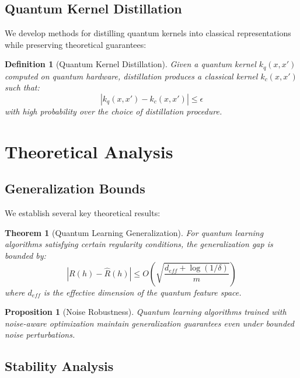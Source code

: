 \documentclass{article}
\newtheorem{theorem}{Theorem}
\newtheorem{proposition}{Proposition}
\newtheorem{definition}{Definition}
\begin{document}
\subsection{Quantum Kernel Distillation}

We develop methods for distilling quantum kernels into classical representations while preserving theoretical guarantees:

\begin{definition}[Quantum Kernel Distillation]
Given a quantum kernel $k_q(x, x')$ computed on quantum hardware, distillation produces a classical kernel $k_c(x, x')$ such that:
\begin{equation}
|k_q(x, x') - k_c(x, x')| \leq \epsilon
\end{equation}
with high probability over the choice of distillation procedure.
\end{definition}

\section{Theoretical Analysis}

\subsection{Generalization Bounds}

We establish several key theoretical results:

\begin{theorem}[Quantum Learning Generalization]
For quantum learning algorithms satisfying certain regularity conditions, the generalization gap is bounded by:
\begin{equation}
|R(h) - \hat{R}(h)| \leq O\left(\sqrt{\frac{d_{eff} + \log(1/\delta)}{m}}\right)
\end{equation}
where $d_{eff}$ is the effective dimension of the quantum feature space.
\end{theorem}

\begin{proposition}[Noise Robustness]
Quantum learning algorithms trained with noise-aware optimization maintain generalization guarantees even under bounded noise perturbations.
\end{proposition}

\subsection{Stability Analysis}
\end{document}
